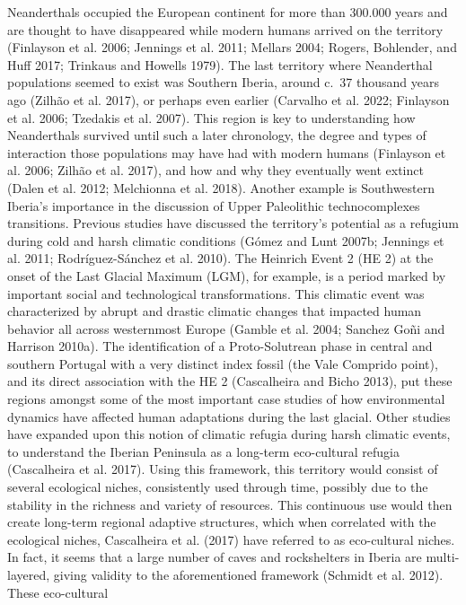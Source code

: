 \documentclass[
  a4paper,
  DIV=11,
  numbers=noendperiod]{scrreprt}
\begin{document}
Neanderthals occupied the European continent for more than 300.000 years
and are thought to have disappeared while modern humans arrived on the
territory (Finlayson et al. 2006; Jennings et al. 2011; Mellars 2004;
Rogers, Bohlender, and Huff 2017; Trinkaus and Howells 1979). The last
territory where Neanderthal populations seemed to exist was Southern
Iberia, around c.~37 thousand years ago (Zilhão et al. 2017), or perhaps
even earlier (Carvalho et al. 2022; Finlayson et al. 2006; Tzedakis et
al. 2007). This region is key to understanding how Neanderthals survived
until such a later chronology, the degree and types of interaction those
populations may have had with modern humans (Finlayson et al. 2006;
Zilhão et al. 2017), and how and why they eventually went extinct (Dalen
et al. 2012; Melchionna et al. 2018). Another example is Southwestern
Iberia's importance in the discussion of Upper Paleolithic
technocomplexes transitions. Previous studies have discussed the
territory's potential as a refugium during cold and harsh climatic
conditions (Gómez and Lunt 2007b; Jennings et al. 2011;
Rodríguez-Sánchez et al. 2010). The Heinrich Event 2 (HE 2) at the onset
of the Last Glacial Maximum (LGM), for example, is a period marked by
important social and technological transformations. This climatic event
was characterized by abrupt and drastic climatic changes that impacted
human behavior all across westernmost Europe (Gamble et al. 2004;
Sanchez Goñi and Harrison 2010a). The identification of a
Proto-Solutrean phase in central and southern Portugal with a very
distinct index fossil (the Vale Comprido point), and its direct
association with the HE 2 (Cascalheira and Bicho 2013), put these
regions amongst some of the most important case studies of how
environmental dynamics have affected human adaptations during the last
glacial. Other studies have expanded upon this notion of climatic
refugia during harsh climatic events, to understand the Iberian
Peninsula as a long-term eco-cultural refugia (Cascalheira et al. 2017).
Using this framework, this territory would consist of several ecological
niches, consistently used through time, possibly due to the stability in
the richness and variety of resources. This continuous use would then
create long-term regional adaptive structures, which when correlated
with the ecological niches, Cascalheira et al. (2017) have referred to
as eco-cultural niches. In fact, it seems that a large number of caves
and rockshelters in Iberia are multi-layered, giving validity to the
aforementioned framework (Schmidt et al. 2012). These eco-cultural
\end{document}
